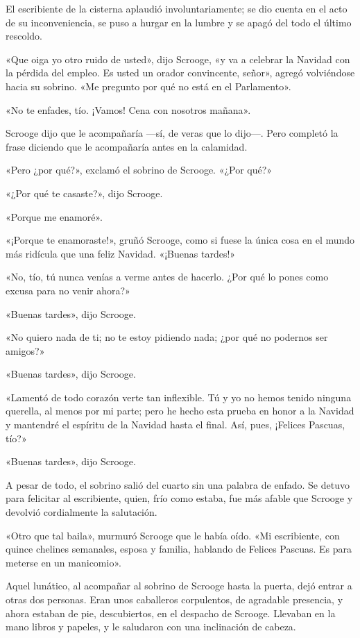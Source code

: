 \documentclass{novela}
\begin{document}
 El escribiente de la cisterna aplaudió involuntariamente; se dio cuenta en el acto de su inconveniencia, se puso a hurgar en la lumbre y se apagó del todo el último rescoldo.

 «Que oiga yo otro ruido de usted», dijo Scrooge, «y va a celebrar la Navidad con la pérdida del empleo. Es usted un orador convincente, señor», agregó volviéndose hacia su sobrino. «Me pregunto por qué no está en el Parlamento».

 «No te enfades, tío. ¡Vamos! Cena con nosotros mañana».

 Scrooge dijo que le acompañaría ---sí, de veras que lo dijo---. Pero completó la frase diciendo que le acompañaría antes en la calamidad.

 «Pero ¿por qué?», exclamó el sobrino de Scrooge. «¿Por qué?»

 «¿Por qué te casaste?», dijo Scrooge.

 «Porque me enamoré».

 «¡Porque te enamoraste!», gruñó Scrooge, como si fuese la única cosa en el mundo más ridícula que una feliz Navidad. «¡Buenas tardes!»

 «No, tío, tú nunca venías a verme antes de hacerlo. ¿Por qué lo pones como excusa para no venir ahora?»

 «Buenas tardes», dijo Scrooge.

 «No quiero nada de ti; no te estoy pidiendo nada; ¿por qué no podernos ser amigos?»

 «Buenas tardes», dijo Scrooge.

 «Lamentó de todo corazón verte tan inflexible. Tú y yo no hemos tenido ninguna querella, al menos por mi parte; pero he hecho esta prueba en honor a la Navidad y mantendré el espíritu de la Navidad hasta el final. Así, pues, ¡Felices Pascuas, tío?»

 «Buenas tardes», dijo Scrooge.

 A pesar de todo, el sobrino salió del cuarto sin una palabra de enfado. Se detuvo para felicitar al escribiente, quien, frío como estaba, fue más afable que Scrooge y devolvió cordialmente la salutación.

 «Otro que tal baila», murmuró Scrooge que le había oído. «Mi escribiente, con quince chelines semanales, esposa y familia, hablando de Felices Pascuas. Es para meterse en un manicomio».

 Aquel lunático, al acompañar al sobrino de Scrooge hasta la puerta, dejó entrar a otras dos personas. Eran unos caballeros corpulentos, de agradable presencia, y ahora estaban de pie, descubiertos, en el despacho de Scrooge. Llevaban en la mano libros y papeles, y le saludaron con una inclinación de cabeza.
\end{document}
